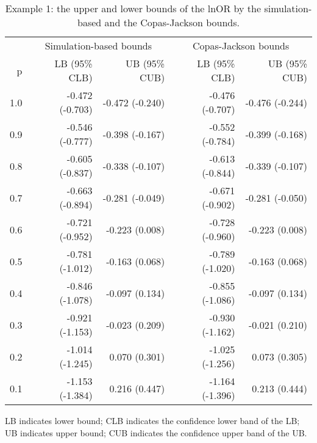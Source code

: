 \begin{table}

\caption{\label{tab:tab1}Example 1: the upper and lower bounds of the lnOR by the simulation-based and the Copas-Jackson bounds.}
\centering
\begin{threeparttable}
\begin{tabular}[t]{rrrrr}
\toprule
\multicolumn{1}{c}{} & \multicolumn{2}{c}{Simulation-based bounds} & \multicolumn{2}{c}{Copas-Jackson bounds} \\
\cmidrule(l{3pt}r{3pt}){2-3} \cmidrule(l{3pt}r{3pt}){4-5}
p & LB (95\% CLB) & UB (95\% CUB) & LB (95\% CLB) & UB (95\% CUB)\\
\midrule
1.0 & -0.472 (-0.703) & -0.472 (-0.240) & -0.476 (-0.707) & -0.476 (-0.244)\\
0.9 & -0.546 (-0.777) & -0.398 (-0.167) & -0.552 (-0.784) & -0.399 (-0.168)\\
0.8 & -0.605 (-0.837) & -0.338 (-0.107) & -0.613 (-0.844) & -0.339 (-0.107)\\
0.7 & -0.663 (-0.894) & -0.281 (-0.049) & -0.671 (-0.902) & -0.281 (-0.050)\\
0.6 & -0.721 (-0.952) & -0.223 (0.008) & -0.728 (-0.960) & -0.223 (0.008)\\
0.5 & -0.781 (-1.012) & -0.163 (0.068) & -0.789 (-1.020) & -0.163 (0.068)\\
0.4 & -0.846 (-1.078) & -0.097 (0.134) & -0.855 (-1.086) & -0.097 (0.134)\\
0.3 & -0.921 (-1.153) & -0.023 (0.209) & -0.930 (-1.162) & -0.021 (0.210)\\
0.2 & -1.014 (-1.245) & 0.070 (0.301) & -1.025 (-1.256) & 0.073 (0.305)\\
0.1 & -1.153 (-1.384) & 0.216 (0.447) & -1.164 (-1.396) & 0.213 (0.444)\\
\bottomrule
\end{tabular}
\begin{tablenotes}
\item 
           LB indicates lower bound; CLB indicates the confidence lower band of the LB; 
           UB indicates upper bound; CUB indicates the confidence upper band of the UB.
\end{tablenotes}
\end{threeparttable}
\end{table}
